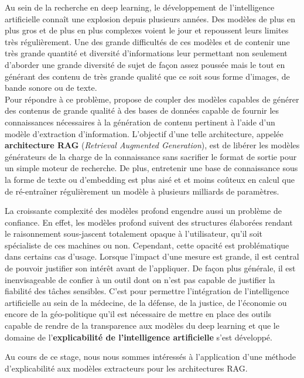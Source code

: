         Au sein de la recherche en deep learning, le développement de l'intelligence artificielle connaît une explosion depuis plusieurs années. Des modèles de plus en plus gros et de plus en plus complexes voient le jour et repoussent leurs limites très régulièrement. Une des grande difficultés de ces modèles et de contenir une très grande quantité et diversité d'informations leur permettant non seulement d'aborder une grande diversité de sujet de façon assez poussée mais le tout en générant des contenu de très grande qualité que ce soit sous forme d'images, de bande sonore ou de texte. \\
        Pour répondre à ce problème, \cite{lewis_retrieval-augmented_2020} propose de coupler des modèles capables de générer des contenus de grande qualité à des bases de données capable de fournir les connaissances nécessaires à la génération de contenu pertinent à l'aide d'un modèle d'extraction d'information. L'objectif d'une telle architecture, appelée \textbf{architecture RAG} (\textit{Retrieval Augmented Generation}), est de libérer les modèles générateurs de la charge de la connaissance sans sacrifier le format de sortie pour un simple moteur de recherche. De plus, entretenir une base de connaissance sous la forme de texte ou d'embedding est plus aisé et et moins coûteux en calcul que de ré-entraîner régulièrement un modèle à plusieurs milliards de paramètres.

        La croissante complexité des modèles profond engendre aussi un problème de confiance. En effet, les modèles profond suivent des structures élaborées rendant le raisonnement sous-jascent totalement opaque à l'utilisateur, qu'il soit spécialiste de ces machines ou non. Cependant, cette opacité est problématique dans certains cas d'usage. Lorsque l'impact d'une mesure est grande, il est central de pouvoir justifier son intérêt avant de l'appliquer. De façon plus générale, il est inenvisageable de confier à un outil dont on n'est pas capable de justifier la fiabilité des tâches sensibles. C'est pour permettre l'intégration de l'intelligence artificielle au sein de la médecine, de la défense, de la justice, de l'économie ou encore de la géo-politique qu'il est nécessaire de mettre en place des outils capable de rendre de la transparence aux modèles du deep learning et que le domaine de l'\textbf{explicabilité de l'intelligence artificielle} s'est développé.

        Au cours de ce stage, nous nous sommes intéressés à l'application d'une méthode d'explicabilité aux modèles extracteurs pour les architectures RAG.

